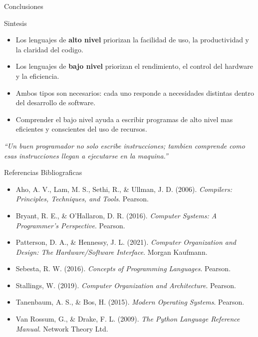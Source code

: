 \documentclass[10pt, aspectratio=169]{beamer}
\begin{document}
	\begin{frame}{Conclusiones}
		\begin{block}{Sintesis}
			\begin{itemize}
				\item Los lenguajes de \textbf{alto nivel} priorizan la facilidad de uso,
				la productividad y la claridad del codigo.
				\item Los lenguajes de \textbf{bajo nivel} priorizan el rendimiento, el control
				del hardware y la eficiencia.
				\item Ambos tipos son necesarios: cada uno responde a necesidades distintas
				dentro del desarrollo de software.
				\item Comprender el bajo nivel ayuda a escribir programas de alto nivel mas
				eficientes y conscientes del uso de recursos.
			\end{itemize}
		\end{block}
		
		\vspace{0.3cm}
		\centering
		\textit{``Un buen programador no solo escribe instrucciones; tambien comprende
			como esas instrucciones llegan a ejecutarse en la maquina.''}
	\end{frame}
	
	\begin{frame}{Referencias Bibliograficas}
		\small
		\begin{itemize}
			\item Aho, A. V., Lam, M. S., Sethi, R., \& Ullman, J. D. (2006).
			\textit{Compilers: Principles, Techniques, and Tools}. Pearson.
			\item Bryant, R. E., \& O'Hallaron, D. R. (2016).
			\textit{Computer Systems: A Programmer's Perspective}. Pearson.
			\item Patterson, D. A., \& Hennessy, J. L. (2021).
			\textit{Computer Organization and Design: The Hardware/Software Interface}.
			Morgan Kaufmann.
			\item Sebesta, R. W. (2016).
			\textit{Concepts of Programming Languages}. Pearson.
			\item Stallings, W. (2019).
			\textit{Computer Organization and Architecture}. Pearson.
			\item Tanenbaum, A. S., \& Bos, H. (2015).
			\textit{Modern Operating Systems}. Pearson.
			\item Van Rossum, G., \& Drake, F. L. (2009).
			\textit{The Python Language Reference Manual}. Network Theory Ltd.
		\end{itemize}
	\end{frame}
	
\end{document}
